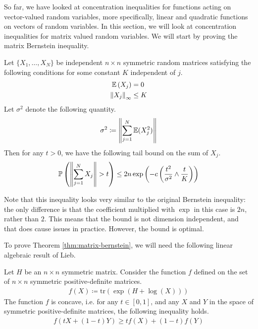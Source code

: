 \documentclass[11pt]{article}
\begin{document}
So far, we have looked at concentration inequalities for functions acting on vector-valued random variables, more specifically, linear and quadratic functions on vectors of random variables.
In this section, we will look at concentration inequalities for matrix valued random variables.
We will start by proving the matrix Bernstein inequality.
\begin{theorem}
  \label{thm:matrix-bernstein}
  Let $\{X_1, \ldots, X_N\}$ be independent $n \times n$ symmetric random matrices satisfying the following conditions for some constant $K$ independent of $j$.
  \begin{align*}
    \mathbb{E}\left( X_j \right) &= 0 \\
    \left\lVert X_j\right\rVert_{\infty} &\leq K
  \end{align*}
  Let $\sigma^2$ denote the following quantity.
  \begin{align*}
    \sigma^2 \coloneqq \left\lVert\sum_{j=1}^N \mathbb{E}(X_j^2)\right\rVert
  \end{align*}
  Then for any $t > 0$, we have the following tail bound on the sum of $X_j$.
  \begin{align*}
    \mathbb{P}\left( \left\lVert\sum_{j=1}^N X_j\right\rVert > t \right)
    \leq 2n \exp\left( -c \left( \frac{t^2}{\sigma^2} \wedge \frac{t}{K} \right) \right)
  \end{align*}
\end{theorem}
\begin{remark}
  Note that this inequality looks very similar to the original Bernstein inequality: the only difference is that the coefficient multiplied with $\exp$ in this case is $2n$, rather than $2$.
  This means that the bound is not dimension independent, and that does cause issues in practice.
  However, the bound is optimal.
\end{remark}

To prove Theorem \ref{thm:matrix-bernstein}, we will need the following linear algebraic result of Lieb.

\begin{theorem}
  Let $H$ be an $n \times n$ symmetric matrix.
  Consider the function $f$ defined on the set of $n \times n$ symmetric positive-definite matrices.
  \begin{align*}
    f(X) \coloneqq \mathrm{tr} \left( \exp\left( H + \log(X) \right) \right)
  \end{align*}
  The function $f$ is concave, i.e. for any $t \in [0,1]$, and any $X$ and $Y$ in the space of symmetric positive-definite matrices, the following inequality holds.
  \begin{align*}
    f(tX + (1-t)Y) \geq tf(X) + (1-t)f(Y)
  \end{align*}
\end{theorem}
\end{document}
